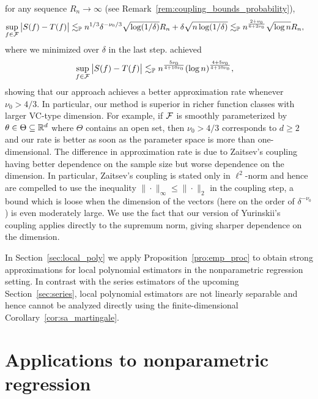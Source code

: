 for any sequence $R_n \to \infty$
(see Remark~\ref{rem:coupling_bounds_probability}),
%
\begin{align*}
  \sup_{f \in \mathcal{F}}
  \big| S(f) - T(f) \big|
  &\lesssim_{\mathbb{P}}
  n^{1/3} \delta^{-\nu_0/3}
  \sqrt{\log(1/\delta)} R_n
  + \delta \sqrt{n\log(1/\delta)}
  \lesssim_{\mathbb{P}}
  n^{\frac{2+\nu_0}{6+2\nu_0}}
  \sqrt{\log n} R_n,
\end{align*}
%
where we minimized over $\delta$ in the last step.
\citet[Proposition~1]{berthet2006revisiting} achieved
%
\begin{align*}
  \sup_{f \in \mathcal{F}}
  \big| S(f) - T(f) \big|
  &\lesssim_{\mathbb{P}}
  n^{\frac{5\nu_0}{4+10\nu_0}}
  (\log n)^{\frac{4+5\nu_0}{4+10\nu_0}},
\end{align*}
%
showing that our approach achieves a better approximation rate whenever
$\nu_0 > 4/3$. In particular, our method is superior in richer function classes
with larger VC-type dimension. For example, if $\mathcal{F}$ is smoothly parameterized
by $\theta \in \Theta \subseteq \mathbb{R}^d$ where $\Theta$ contains an open set, then
$\nu_0 > 4/3$ corresponds to $d \geq 2$ and our rate is better as soon as the
parameter space is more than one-dimensional. The difference in approximation
rate is due to Zaitsev's coupling having better dependence on the sample size
but worse dependence on the dimension. In particular, Zaitsev's coupling is
stated only in $\ell^2$-norm and hence
\citet[Equation~5.3]{berthet2006revisiting} are compelled to use the inequality
$\|\cdot\|_\infty \leq \|\cdot\|_2$ in the coupling step, a bound which is
loose when the dimension of the vectors (here on the order of
$\delta^{-\nu_0}$) is even moderately large. We use the fact that our version
of Yurinskii's coupling applies directly to the supremum norm, giving sharper
dependence on the dimension.

In Section~\ref{sec:local_poly} we apply Proposition~\ref{pro:emp_proc} to
obtain strong approximations for local polynomial estimators in the
nonparametric regression setting. In contrast with the series estimators of the
upcoming Section~\ref{sec:series}, local polynomial estimators are not linearly
separable and hence cannot be analyzed directly using the finite-dimensional
Corollary~\ref{cor:sa_martingale}.

\section{Applications to nonparametric regression}
\label{sec:nonparametric}

